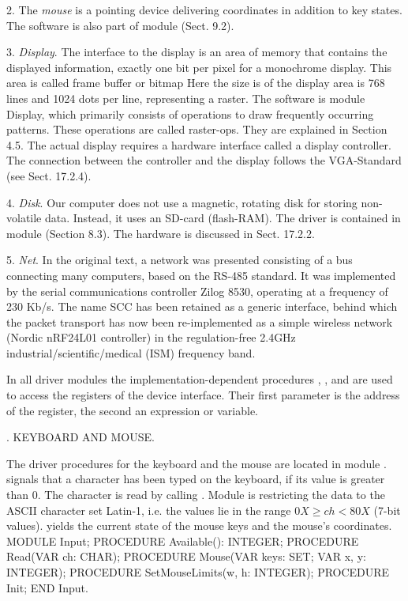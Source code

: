 2. The \emph{mouse} is a pointing device delivering coordinates in addition to key states. The software is also part of module  (Sect. 9.2).

3. \emph{Display}. The interface to the display is an area of memory that contains the displayed information, exactly one bit per pixel for a monochrome display. This area is called frame buffer or bitmap Here the size is of the display area is 768 lines and 1024 dots per line, representing a raster. The software is module Display, which primarily consists of operations to draw frequently occurring patterns. These operations are called raster-ops. They are explained in Section 4.5. The actual display requires a hardware interface called a display controller. The connection between the controller and the display follows the VGA-Standard (see Sect. 17.2.4).

4. \emph{Disk}. Our \RISC computer does not use a magnetic, rotating disk for storing non-volatile data. Instead, it uses an SD-card (flash-RAM). The driver is contained in module  (Section 8.3). The hardware is discussed in Sect. 17.2.2.

5. \emph{Net}. In the original text, a network was presented consisting of a bus connecting many computers, based on the RS-485 standard. It was implemented by the serial communications controller Zilog 8530, operating at a frequency of 230 Kb/s. The name SCC has been retained as a generic interface, behind which the packet transport has now been re-implemented as a simple wireless network (Nordic nRF24L01 controller) in the regulation-free 2.4GHz industrial/scientific/medical (ISM) frequency band.

In all driver modules the implementation-dependent procedures , , and  are used to access the registers of the device interface. Their first parameter is the address of the register, the second an expression or variable.

. KEYBOARD AND MOUSE.

The driver procedures for the keyboard and the mouse are located in module .  signals that a character has been typed on the keyboard, if its value is greater than 0. The character is read by calling . Module  is restricting the data to the ASCII character set Latin-1, i.e. the values lie in the range $0X \ge ch < 80X$ (7-bit values).  yields the current state of the mouse keys and the mouse's coordinates.
\begintt
MODULE Input;
PROCEDURE Available(): INTEGER;
PROCEDURE Read(VAR ch: CHAR);
PROCEDURE Mouse(VAR keys: SET; VAR x, y: INTEGER); PROCEDURE SetMouseLimits(w, h: INTEGER); PROCEDURE Init;
END Input.
\endtt

